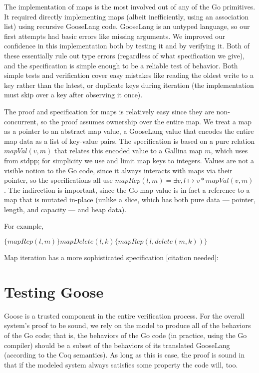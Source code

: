 The implementation of maps is the most involved out of any of the Go
primitives. It required directly implementing maps (albeit
inefficiently, using an association list) using recursive GooseLang
code. GooseLang is an untyped language, so our first attempts had basic
errors like missing arguments. We improved our confidence in this
implementation both by testing it and by verifying it. Both of these
essentially rule out type errors (regardless of what specification we give),
and the specification is simple enough
to be a reliable test of behavior. Both simple tests and verification
cover easy mistakes like reading the oldest write to a key rather than
the latest, or duplicate keys during iteration (the implementation must
skip over a key after observing it once).

The proof and specification for maps is relatively easy since they are
non-concurrent, so the proof assumes ownership over the entire map. We
treat a map as a pointer to an abstract map value, a GooseLang value
that encodes the entire map data as a list of key-value pairs. The
specification is based on a pure relation $mapVal(v, m)$ that relates
this encoded value to a Gallina map $m$, which uses  from
stdpp; for simplicity we use  and limit map
keys to integers. Values are not a visible notion to the Go code, since
it always interacts with maps via their pointer, so the specifications
all use $mapRep(l, m) = \exists v, l \mapsto v * mapVal(v, m)$. The
indirection is important, since the Go map value
 is in fact a reference to a map that is
mutated in-place (unlike a slice, which has both pure data --- pointer,
length, and capacity --- and heap data).

For example,

$\{mapRep(l, m)\} mapDelete(l, k) \{mapRep(l, delete(m, k))\}$

Map iteration has a more sophisticated specification [citation
needed]:


\resume

\section{Testing Goose}

Goose is a trusted component in the entire verification process. For the
overall system's proof to be sound, we rely on the model to produce all
of the behaviors of the Go code; that is, the behaviors of the Go code
(in practice, using the Go compiler) should be a subset of the behaviors
of its translated GooseLang (according to the Coq semantics). As long as
this is case, the proof is sound in that if the modeled system always
satisfies some property the code will, too.

